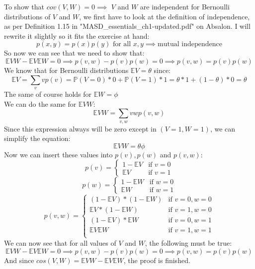 To show that $cov(V,W) = 0 \implies$ $V$ and $W$ are independent for Bernoulli distributions of $V$ and $W$, we first have to look at the definition of independence, as per Definition 1.15 in "MASD\_essentials\_ch1-updated.pdf" on Absalon. I will rewrite it slightly so it fits the exercise at hand:\\
$$
p(x,y)=p(x)p(y) \text{ for all }x,y \implies \text{mutual independence}
$$
So now we can see that we need to show that:
$$
\mathbb{E}VW-\mathbb{E}V \mathbb{E}W = 0 \implies p(v,w)-p(v)p(w) = 0 \implies p(v,w) = p(v)p(w)
$$
We know that for Bernoulli distributions $\mathbb{E}V = \theta$ since:
$$
\mathbb{E}V = \sum_v vp(v) = \mathbb{P}(V=0)*0+\mathbb{P}(V=1)*1 = \theta*1+(1-\theta)*0 = \theta
$$
The same of course holds for $\mathbb{E}W = \phi$\\
We can do the same for $\mathbb{E}VW$:
$$
\mathbb{E}VW = \sum_{v,w} vwp(v,w)
$$
Since this expression always will be zero except in $(V=1,W=1)$, we can simplify the equation:
$$
\mathbb{E}VW = \theta \phi
$$
Now we can insert these values into $p(v),p(w)$ and $p(v,w)$:
$$
p(v) =
\left\{
\begin{array}{ll}
1 - \mathbb{E}V & \text{if } v=0\\
\mathbb{E}V     & \text{if } v=1
\end{array}
\right.
$$
$$
p(w) =
\left\{
\begin{array}{ll}
1 - \mathbb{E}W & \text{if } w=0\\
\mathbb{E}W     & \text{if } w=1
\end{array}
\right.
$$
$$
p(v,w) =
\left\{
\begin{array}{ll}
(1 - \mathbb{E}V)*(1-\mathbb{E}W) & \text{if } v=0,w=0\\
\mathbb{E}V*(1-\mathbb{E}W)       & \text{if } v=1,w=0\\
(1-\mathbb{E}V)*\mathbb{E}W       & \text{if } v=0,w=1\\
\mathbb{E}V \mathbb{E}W           & \text{if } v=1,w=1\\
\end{array}
\right.
$$
We can now see that for all values of $V$ and $W$, the following must be true:
$$
\mathbb{E}VW-\mathbb{E}V \mathbb{E}W = 0 \implies p(v,w)-p(v)p(w) = 0 \implies p(v,w) = p(v)p(w)
$$
And since $cos(V,W)= \mathbb{E}VW-\mathbb{E}V \mathbb{E}W$, the proof is finished.